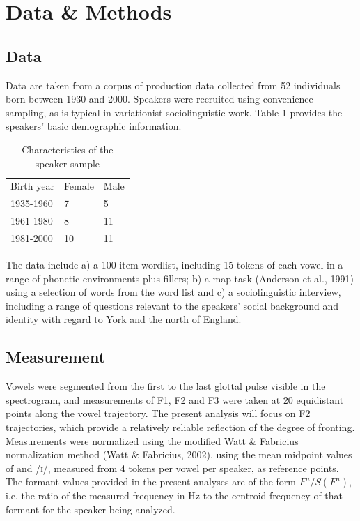 \documentclass[12pt]{article}
\begin{document}
\section{Data \& Methods}

\subsection{Data}

Data are taken from a corpus of production data collected from 52 individuals born between 1930 and 2000. Speakers were recruited using convenience sampling, as is typical in variationist sociolinguistic work. Table 1 provides the speakers' basic demographic information.

\vspace*{6pt}
\begin{table}[htbp]
\centering
\begin{tabular}{l|l|l}
Birth year&Female & Male \\
1935-1960 &7 &5\\
 1961-1980& 8 & 11\\
1981-2000& 10 &11\\
\end{tabular}
\caption{Characteristics of the speaker sample}
\end{table}
\vspace*{6pt}

The data include a) a 100-item wordlist, including 15 tokens of each vowel in a range of phonetic environments plus fillers; b) a map task (Anderson et al., 1991) using a selection of words from the word list and c) a sociolinguistic interview, including a range of questions relevant to the speakers' social background and identity with regard to York and the north of England. 

\subsection{Measurement}

Vowels were segmented from the first to the last glottal pulse visible in the spectrogram, and measurements of F1, F2 and F3 were taken at 20 equidistant points along the vowel trajectory. The present analysis will focus on F2 trajectories, which provide a relatively reliable reflection of the degree of fronting. Measurements were normalized using the modified Watt \& Fabricius normalization method (Watt \& Fabricius, 2002), using the mean midpoint values of  and \textsc{/i/}, measured from 4 tokens per vowel per speaker, as reference points. The formant values provided in the present analyses are of the form $F^n/S (F^n)$, i.e. the ratio of the measured frequency in Hz to the centroid frequency of that formant for the speaker being analyzed.
\end{document}
